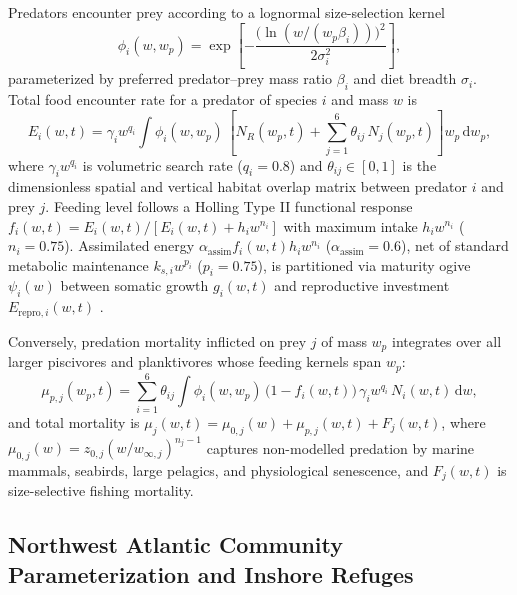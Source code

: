 \documentclass[11pt,letterpaper]{article}
\begin{document}
Predators encounter prey according to a lognormal size-selection kernel
\begin{equation}
  \phi_i(w, w_p) = \exp\!\left[-\frac{\big(\ln(w / (w_p \beta_i))\big)^2}{2\sigma_i^2}\right],
  \label{eq:kernel}
\end{equation}
parameterized by preferred predator--prey mass ratio $\beta_i$ and diet breadth $\sigma_i$. Total food encounter rate for a predator of species $i$ and mass $w$ is
\begin{equation}
  E_i(w,t) = \gamma_i w^{q_i} \int \phi_i(w, w_p)\,\left[N_R(w_p,t) + \sum_{j=1}^{6} \theta_{ij}\,N_j(w_p,t)\right] w_p\,\mathrm{d}w_p,
  \label{eq:encounter}
\end{equation}
where $\gamma_i w^{q_i}$ is volumetric search rate ($q_i = 0.8$) and $\theta_{ij} \in [0,1]$ is the dimensionless spatial and vertical habitat overlap matrix between predator $i$ and prey $j$. Feeding level follows a Holling Type II functional response $f_i(w,t) = E_i(w,t) / [E_i(w,t) + h_i w^{n_i}]$ with maximum intake $h_i w^{n_i}$ ($n_i = 0.75$). Assimilated energy $\alpha_{\mathrm{assim}} f_i(w,t) h_i w^{n_i}$ ($\alpha_{\mathrm{assim}} = 0.6$), net of standard metabolic maintenance $k_{s,i} w^{p_i}$ ($p_i = 0.75$), is partitioned via maturity ogive $\psi_i(w)$ between somatic growth $g_i(w,t)$ and reproductive investment $E_{\mathrm{repro},i}(w,t)$ \citep{scott2014mizer,andersen2019fish}.

Conversely, predation mortality inflicted on prey $j$ of mass $w_p$ integrates over all larger piscivores and planktivores whose feeding kernels span $w_p$:
\begin{equation}
  \mu_{p,j}(w_p,t) = \sum_{i=1}^{6} \theta_{ij} \int \phi_i(w, w_p)\,\big(1 - f_i(w,t)\big)\,\gamma_i w^{q_i}\,N_i(w,t)\,\mathrm{d}w,
  \label{eq:predmort}
\end{equation}
and total mortality is $\mu_j(w,t) = \mu_{0,j}(w) + \mu_{p,j}(w,t) + F_j(w,t)$, where $\mu_{0,j}(w) = z_{0,j} (w / w_{\infty,j})^{n_j - 1}$ captures non-modelled predation by marine mammals, seabirds, large pelagics, and physiological senescence, and $F_j(w,t)$ is size-selective fishing mortality.

\subsection{Northwest Atlantic Community Parameterization and Inshore Refuges}
\end{document}
